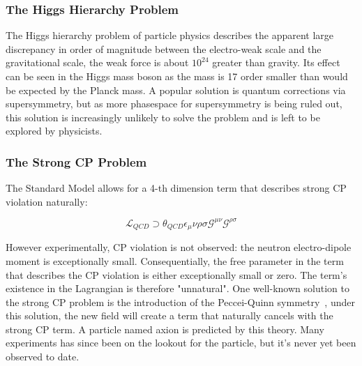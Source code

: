 

\subsubsection{The Higgs Hierarchy Problem}
The Higgs hierarchy problem of particle physics describes the apparent large discrepancy in order of magnitude between the electro-weak scale and the gravitational scale, the weak force is about $10^{24}$ greater than gravity. Its effect can be seen in the Higgs mass boson as the mass is 17 order smaller than would be expected by the Planck mass. 
A popular solution is quantum corrections via supersymmetry, but as more phasespace for supersymmetry is being ruled out, this solution is increasingly unlikely to solve the problem and is left to be explored by physicists.

\subsubsection{The Strong CP Problem}
The Standard Model allows for a 4-th dimension term that describes strong CP violation naturally:

\begin{equation}
    \mathcal{L}_{QCD} \supset \theta_{QCD}\epsilon_\mu\nu\rho\sigma \mathcal{G}^{\mu\nu}\mathcal{G}^{\rho\sigma}
\end{equation}

However experimentally, CP violation is not observed: the neutron electro-dipole moment is exceptionally small. Consequentially, the free parameter in the term that describes the CP violation is either exceptionally small or zero. The term's existence in the Lagrangian is therefore "unnatural".
One well-known solution to the strong CP problem is the introduction of the Peccei-Quinn symmetry~\cite{PQSym}, under this solution, the new field will create a term that naturally cancels with the strong CP term. A particle named axion is predicted by this theory. Many experiments has since been on the lookout for the particle, but it's never yet been observed to date.

